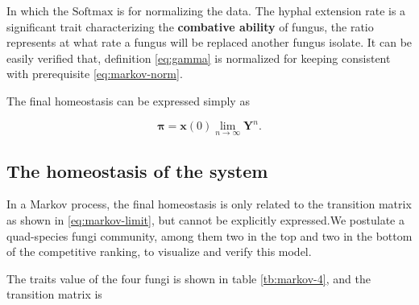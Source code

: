 
In which the $\mathrm{Softmax}$ is for normalizing the data. The hyphal extension rate is a significant trait characterizing the \textbf{combative ability} of fungus, the ratio represents at what rate a fungus will be replaced another fungus isolate. It can be easily verified that, definition \eqref{eq:gamma} is normalized for keeping consistent with prerequisite \eqref{eq:markov-norm}.

The final homeostasis can be expressed simply as

\begin{equation}\label{eq:markov-limit}
    \boldsymbol{\pi} =
    \boldsymbol{x}(0)\lim_{n\rightarrow\infty}\boldsymbol{Y}^n.
\end{equation}


\subsection{The homeostasis of the system}





In a Markov process, the final homeostasis is only related to the transition matrix as shown in \eqref{eq:markov-limit}, but cannot be explicitly expressed.We postulate a quad-species fungi community, among them two in the top and two in the bottom of the competitive ranking, to visualize and verify this model.

The traits value of the four fungi is shown in table \ref{tb:markov-4}, and the transition matrix is

